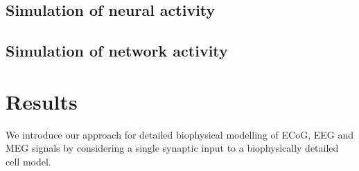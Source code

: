 \documentclass[preprint,10pt,authoryear]{elsarticle}
\newcommand{\tvntxt}[1]{{\color{Emerald}#1}}
\begin{document}
\subsection{Simulation of neural activity} \label{subsec:neuron_models}

\subsection{Simulation of network activity}

\section{Results}\label{sec:results}


\tvntxt{We introduce our approach for detailed biophysical modelling of ECoG, EEG and MEG signals by considering a single synaptic input to a biophysically detailed cell model. }
\end{document}
